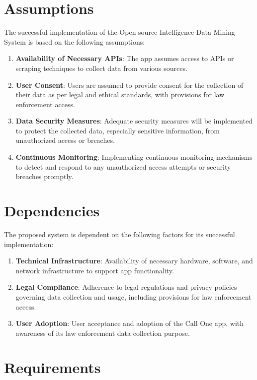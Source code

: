 \section{Assumptions}\label{sec:assumptions}
The successful implementation of the Open-source Intelligence Data Mining System is based on the following assumptions:
\begin{enumerate}[label=\roman*.]
    \item \textbf{Availability of Necessary APIs}: The app assumes access to APIs or scraping techniques to collect data from various sources.
    \item \textbf{User Consent}: Users are assumed to provide consent for the collection of their data as per legal and ethical standards, with provisions for law enforcement access.
    \item \textbf{Data Security Measures}: Adequate security measures will be implemented to protect the collected data, especially sensitive information, from unauthorized access or breaches.
    \item \textbf{Continuous Monitoring}: Implementing continuous monitoring mechanisms to detect and respond to any unauthorized access attempts or security breaches promptly.
\end{enumerate}

\section{Dependencies}\label{sec:dependencies}
The proposed system is dependent on the following factors for its successful implementation:
\begin{enumerate}[label=\roman*.]
    \item \textbf{Technical Infrastructure}: Availability of necessary hardware, software, and network infrastructure to support app functionality.
    \item \textbf{Legal Compliance}: Adherence to legal regulations and privacy policies governing data collection and usage, including provisions for law enforcement access.
    \item \textbf{User Adoption}: User acceptance and adoption of the Call One app, with awareness of its law enforcement data collection purpose.
\end{enumerate}

\section{Requirements}\label{sec:requirements}

